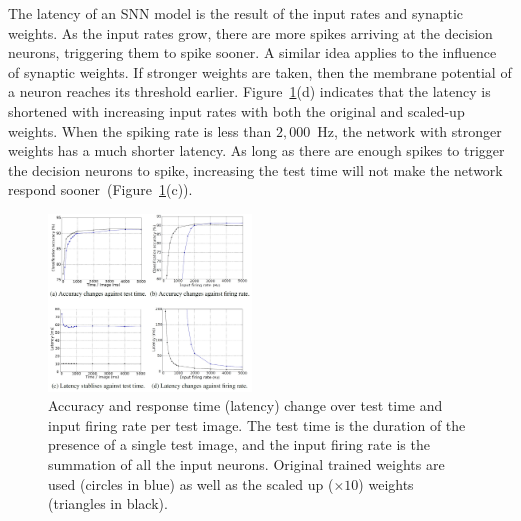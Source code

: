 \documentclass{frontiersENG} %
\begin{document}
The latency of an SNN model is the result of the input rates and synaptic weights.
As the input rates grow, there are more spikes arriving at the decision neurons, triggering them to spike sooner.
A similar idea applies to the influence of synaptic weights.
If stronger weights are taken, then the membrane potential of a neuron reaches its threshold earlier.
Figure~\ref{fig:assess}(d) indicates that the latency is shortened with increasing input rates with both the original and scaled-up weights.
When the spiking rate is less than $2,000$~Hz, the network with stronger weights has a much shorter latency.
As long as there are enough spikes to trigger the decision neurons to spike, increasing the test time will not make the network respond sooner~(Figure~\ref{fig:assess}(c)).
\begin{figure}[htb!]
	\centering
	\includegraphics[width=0.48\textwidth]{fig7}
	\caption{Accuracy and response time (latency) change over test time and input firing rate per test image.
	The test time is the duration of the presence of a single test image, and the input firing rate is the summation of all the input neurons.
	Original trained weights are used (circles in blue) as well as the scaled up ($\times10$) weights (triangles in black). }
	\label{fig:assess}
\end{figure}
\end{document}
